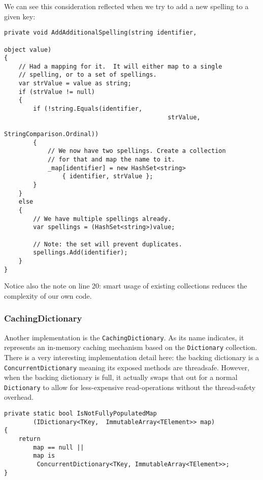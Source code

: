 \begin{minipage}{.95\linewidth}
We can see this consideration reflected when we try to add a new spelling to a given key:

\begin{lstlisting}
private void AddAdditionalSpelling(string identifier, 
																	 object value)
{
	// Had a mapping for it.  It will either map to a single 
	// spelling, or to a set of spellings.
	var strValue = value as string;
	if (strValue != null)
	{
		if (!string.Equals(identifier, 
											 strValue, 
											 StringComparison.Ordinal))
		{
			// We now have two spellings. Create a collection 
			// for that and map the name to it.
			_map[identifier] = new HashSet<string> 
				{ identifier, strValue };
		}
	}
	else
	{
		// We have multiple spellings already.
		var spellings = (HashSet<string>)value;

		// Note: the set will prevent duplicates.
		spellings.Add(identifier);
	}
}
\end{lstlisting}
\end{minipage}

Notice also the note on line 20: smart usage of existing collections reduces the complexity of our own code.

\newpage
\subsubsection{CachingDictionary}
\label{sec:spec-coll-cachingdictionary}

Another implementation is the \texttt{CachingDictionary}. As its name indicates, it represents an in-memory caching mechanism based on the \texttt{Dictionary} collection. There is a very interesting implementation detail here: the backing dictionary is a \\ \texttt{ConcurrentDictionary} meaning its exposed methods are \gls{threadsafe}. However, when the backing dictionary is full, it actually swaps that out for a normal \texttt{Dictionary} to allow for less-expensive read-operations without the thread-safety overhead.

\begin{lstlisting}
private static bool IsNotFullyPopulatedMap
		(IDictionary<TKey,	ImmutableArray<TElement>> map)
{
	return 
		map == null || 
		map is 
		 ConcurrentDictionary<TKey, ImmutableArray<TElement>>;
}
\end{lstlisting}